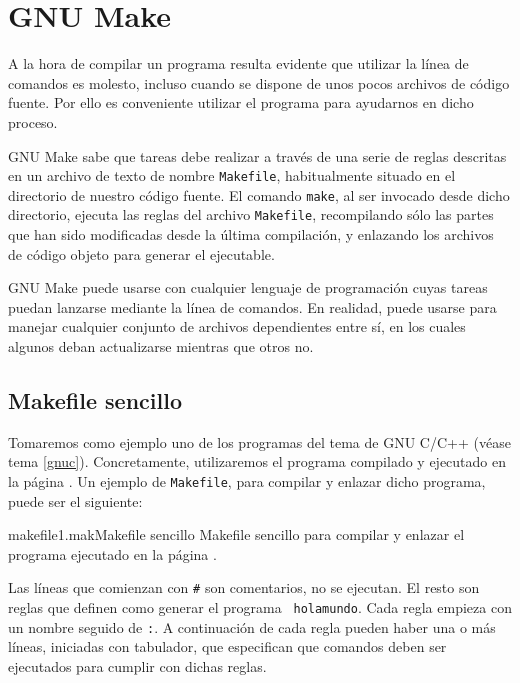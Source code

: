 
\chapter{GNU Make}\label{make}
\label{gnumake.tex}

A la hora de compilar un programa resulta evidente que utilizar la línea
de comandos es molesto, incluso cuando se dispone de unos pocos archivos
de código fuente. Por ello es conveniente utilizar el programa {} para ayudarnos en dicho proceso.

{\sf GNU Make} sabe que tareas debe realizar a través de una serie
de reglas descritas en un archivo de texto de nombre {\tt Makefile},
habitualmente situado en el directorio de nuestro código fuente. El
comando {\tt make}, al ser invocado desde dicho directorio,
ejecuta las reglas del archivo {\tt Makefile},
recompilando sólo las partes que han sido modificadas desde la última
compilación, y enlazando los archivos de código objeto para generar el
ejecutable.

{\sf GNU Make} puede usarse con cualquier lenguaje de programación cuyas
tareas puedan lanzarse mediante la línea de comandos. En realidad, puede
usarse para manejar cualquier conjunto de archivos dependientes entre
sí, en los cuales algunos deban actualizarse mientras que otros no.


\section{Makefile sencillo}

Tomaremos como ejemplo uno de los programas del tema de GNU C/C++
(véase tema \ref{gnuc}). Concretamente, utilizaremos el programa
compilado y ejecutado en la página \pageref{holafuncm}. Un ejemplo de
{\tt Makefile}, para compilar y enlazar dicho programa, puede ser el
siguiente:

\begin{ejemplo}{makefile1.mak}{Makefile sencillo}
Makefile sencillo para compilar y enlazar el programa ejecutado en la
página \pageref{holafuncm}.
\end{ejemplo}

Las líneas que comienzan con {\tt \#} son comentarios, no se ejecutan.
El resto son reglas que definen como generar el programa {\tt
holamundo}. Cada regla empieza con un nombre seguido de {\tt :}. A
continuación de cada regla pueden haber una o más líneas, iniciadas
con tabulador, que especifican que comandos deben ser ejecutados para
cumplir con dichas reglas.

